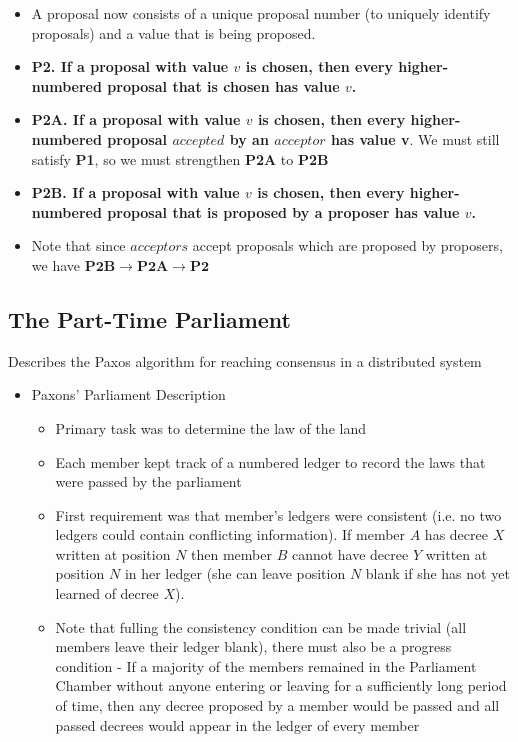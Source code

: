 \documentclass[a4paper]{article}
\begin{document}
\begin{itemize}
\begin{itemize}
\begin{itemize}
\item A proposal now consists of a unique proposal number (to uniquely identify proposals) and a value that is being proposed.

\item \textbf{P2. If a proposal with value $v$ is chosen, then every higher-numbered proposal that is chosen has value $v$.}

\item \textbf{P2A. If a proposal with value $v$ is chosen, then every higher-numbered proposal $accepted$ by an $acceptor$ has value v}. We must still satisfy \textbf{P1}, so we must strengthen \textbf{P2A} to \textbf{P2B}

\item \textbf{P2B. If a proposal with value $v$ is chosen, then every higher-numbered proposal that is proposed by a proposer has value $v$.}

\item Note that since $acceptors$ accept proposals which are proposed by proposers, we have $\textbf{P2B} \rightarrow \textbf{P2A} \rightarrow \textbf{P2}$

\end{itemize}
\end{itemize}
\end{itemize}

\subsection{The Part-Time Parliament}

Describes the Paxos algorithm for reaching consensus in a distributed system

\begin{itemize}
\item Paxons' Parliament Description
\begin{itemize}
\item Primary task was to determine the law of the land

\item Each member kept track of a numbered ledger to record the laws that were passed by the parliament

\item First requirement was that member's ledgers were consistent (i.e. no two ledgers could contain conflicting information). If member $A$ has decree $X$ written at position $N$ then member $B$ cannot have decree $Y$ written at position $N$ in her ledger (she can leave position $N$ blank if she has not yet learned of decree $X$).

\item Note that fulling the consistency condition can be made trivial (all members leave their ledger blank), there must also be a progress condition - If a majority of the members remained in the Parliament Chamber without anyone entering or leaving for a sufficiently long period of time, then any decree proposed by a member would be passed and all passed decrees would appear in the ledger of every member
\end{itemize}
\end{itemize}
\end{document}
